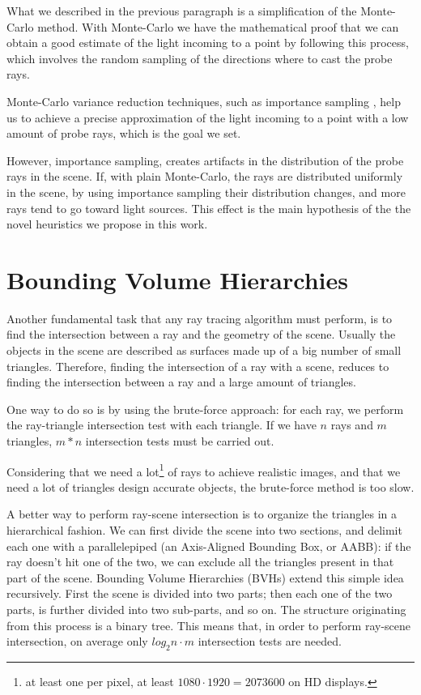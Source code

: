 \documentclass{PoliMi_MasterThesis}
\begin{document}
What we described in the previous paragraph is a simplification of the Monte-Carlo method. With Monte-Carlo we have the mathematical proof that we can obtain a good estimate of the light incoming to a point by following this process, which involves the random sampling of the directions where to cast the probe rays.

Monte-Carlo variance reduction techniques, such as importance sampling \cite{importance_sampling}\cite{multi_light_sampling}, help us to achieve a precise approximation of the light incoming to a point with a low amount of probe rays, which is the goal we set.

However, importance sampling, creates artifacts in the distribution of the probe rays in the scene. If, with plain Monte-Carlo, the rays are distributed uniformly in the scene, by using importance sampling their distribution changes, and more rays tend to go toward light sources. This effect is the main hypothesis of the the novel heuristics we propose in this work.

\section*{Bounding Volume Hierarchies}
Another fundamental task that any ray tracing algorithm must perform, is to find the intersection between a ray and the geometry of the scene. Usually the objects in the scene are described as surfaces made up of a big number of small triangles. Therefore, finding the intersection of a ray with a scene, reduces to finding the intersection between a ray and a large amount of triangles.

One way to do so is by using the brute-force approach: for each ray, we perform the ray-triangle intersection test with each triangle. If we have $n$ rays and $m$ triangles, $m*n$ intersection tests must be carried out.

Considering that we need a lot\footnote{at least one per pixel, at least $1080 \cdot 1920 = 2073600$ on HD displays.} of rays to achieve realistic images, and that we need a lot of triangles design accurate objects, the brute-force method is too slow.

A better way to perform ray-scene intersection is to organize the triangles in a hierarchical fashion. We can first divide the scene into two sections, and delimit each one with a parallelepiped (an Axis-Aligned Bounding Box, or AABB): if the ray doesn't hit one of the two, we can exclude all the triangles present in that part of the scene. Bounding Volume Hierarchies (BVHs) extend this simple idea recursively. First the scene is divided into two parts; then each one of the two parts, is further divided into two sub-parts, and so on. The structure originating from this process is a binary tree. This means that, in order to perform ray-scene intersection, on average only $log_2 n \cdot m$ intersection tests are needed.
\end{document}
